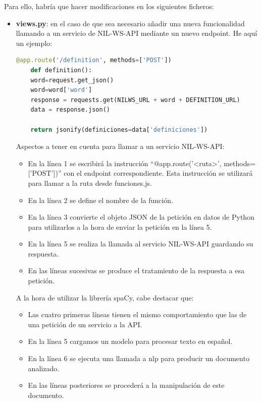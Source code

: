 Para ello, habría que hacer modificaciones en los siguientes ficheros:
\begin{itemize}
	\item \textbf{views.py}: en el caso de que sea necesario añadir una nueva funcionalidad llamando a un servicio de NIL-WS-API mediante un nuevo endpoint. He aquí un ejemplo:
	
			\begin{lstlisting}[language=python,firstnumber=1]
	@app.route('/definition', methods=['POST'])
	def definition():
	word=request.get_json()
	word=word['word']
	response = requests.get(NILWS_URL + word + DEFINITION_URL)
	data = response.json()
	
	return jsonify(definiciones=data['definiciones'])
	\end{lstlisting}

Aspectos a tener en cuenta para llamar a un servicio NIL-WS-API:
\begin{itemize}
	\item En la línea 1 se escribirá la instrucción ``$@$app.route('<ruta>', methods=['POST'])'' con el endpoint correspondiente. Esta instrucción se utilizará para llamar a la ruta desde funciones.js.
	\item En la línea 2 se define el nombre de la función.
	\item En la línea 3 convierte el objeto JSON de la petición en datos de Python para utilizarlos a la hora de enviar la petición en la línea 5.
	\item En la línea 5 se realiza la llamada al servicio NIL-WS-API guardando su respuesta.
	\item En las líneas sucesivas se produce el tratamiento de la respuesta a esa petición.
\end{itemize}

A la hora de utilizar la librería spaCy, cabe destacar que:

\begin{itemize}
	\item Las cuatro primeras líneas tienen el mismo comportamiento que las de una petición de un servicio a la API.
	\item En la línea 5 cargamos un modelo para procesar texto en español.
	\item En la línea 6 se ejecuta una llamada a nlp para producir un documento analizado.
	\item En las líneas posteriores se procederá a la manipulación de este documento.
\end{itemize}


\end{itemize}
